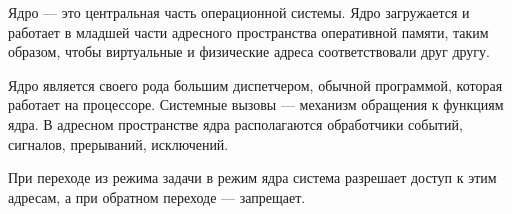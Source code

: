 Ядро --- это центральная часть операционной системы. Ядро загружается и работает в младшей части адресного пространства оперативной памяти, таким образом, чтобы виртуальные и физические адреса соответствовали друг другу. 

Ядро является своего рода большим диспетчером, обычной программой, которая работает на процессоре. Системные вызовы --- механизм обращения к функциям ядра. В адресном пространстве ядра располагаются обработчики событий, сигналов, прерываний, исключений. 

При переходе из режима задачи в режим ядра система разрешает доступ к этим адресам, а при обратном переходе --- запрещает. 